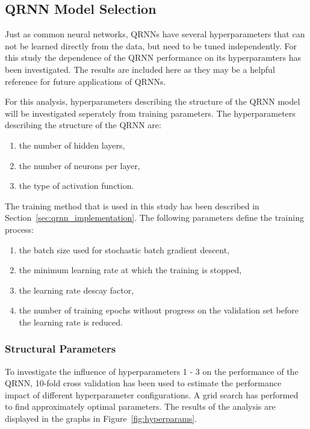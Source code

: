 \documentclass[journal abbreviation, manuscript]{copernicus}
\begin{document}
\subsection{QRNN Model Selection}

Just as common neural networks, QRNNs have several hyperparameters that can not
be learned directly from the data, but need to be tuned independently. For this
study the dependence of the QRNN performance on its hyperparamters has been
investigated. The results are included here as they may be a helpful reference
for future applications of QRNNs.

For this analysis, hyperparameters describing the structure of the QRNN model
will be investigated seperately from training parameters. The hyperparameters
describing the structure of the QRNN are:
\begin{enumerate}
  \item the number of hidden layers,
  \item the number of neurons per layer,
  \item the type of activation function.
  \setcounter{enumic}{\value{enumi}}
\end{enumerate}
The training method that is used in this study has been described in
Section~\ref{sec:qrnn_implementation}.  The following parameters define
the training process:
\begin{enumerate}
  \setcounter{enumi}{\value{enumic}}
  \item the batch size used for stochastic batch gradient descent,
  \item the minimum learning rate at which the training is stopped,
  \item the learning rate descay factor,
  \item the number of training epochs without progress on the validation set
     before the learning rate is reduced.
\end{enumerate}

\subsubsection{Structural Parameters}

  To investigate the influence of hyperparameters 1 - 3 on the performance of the
  QRNN, 10-fold cross validation has been used to estimate the performance
  impact of different hyperparameter configurations. A grid search has
  performed to find  approximately optimal parameters. The results of the
  analysis are displayed in the graphs in Figure~\ref{fig:hyperparams}.
\end{document}
